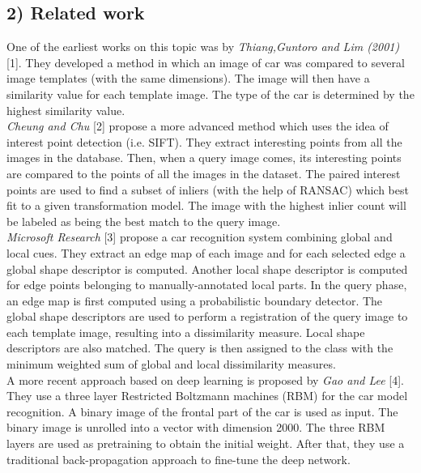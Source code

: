 \documentclass[a4paper]{article}
\begin{document}
\subsection*{2) Related work}
\begin{justify}
One of the earliest works on this topic was by \textit{Thiang,Guntoro and Lim (2001)} [1]. They developed a method in which an image of car was compared to several image templates (with the same dimensions).
The image will then have a similarity value for each template image. The type of the car is determined by the highest similarity value.
\newline
\\
\textit{Cheung and Chu} [2] propose a more advanced method which uses the idea of interest point detection (i.e. SIFT). They extract interesting points from all the images in the database. Then, when a query image comes, its interesting points are compared to the points of all the images in the dataset. The paired interest points are used to find a subset of inliers (with the help of RANSAC) which best fit to a given transformation model. The image with the highest inlier count will be labeled as being the best match to the query image.
\newline
\\
\textit{Microsoft Research} [3] propose a car recognition system combining global and local cues. They extract an edge map of each image and for each selected edge a global shape descriptor is computed.
Another local shape descriptor is computed  for edge points belonging to manually-annotated local parts. In the query phase, an edge map is first computed using a probabilistic boundary detector. 
\newline
The global shape descriptors are used to perform a registration of the query image to each template image, resulting into a dissimilarity measure. Local shape descriptors are also matched. The query is then assigned to the class with the minimum weighted sum of global and local dissimilarity measures.
\newline
\\
A more recent approach based on deep learning is proposed by \textit{Gao and Lee} [4]. They use a three layer Restricted Boltzmann machines (RBM) for the car model recognition. A binary image of the frontal part of the car is used as input. The binary image is unrolled into a vector with dimension 2000. The three RBM layers are used as pretraining to obtain the initial weight. After that, they use a traditional back-propagation approach to fine-tune
the deep network.
\end{justify}
\end{document}
